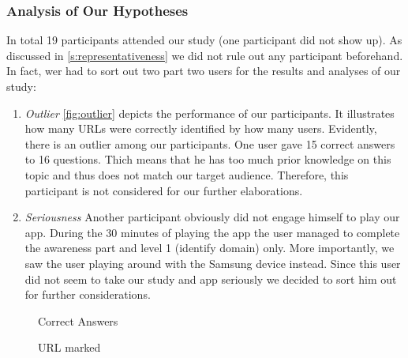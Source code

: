 \subsubsection{Analysis of Our Hypotheses}
\label{s:hypanalysis}
In total 19 participants attended our study (one participant did not show up).
As discussed in \autoref{s:representativeness} we did not rule out any participant beforehand.
In fact, wer had to sort out two part two users for the results and analyses of our study:

\begin{enumerate}
	\item\textit{Outlier} \autoref{fig:outlier} depicts the performance of our participants.
	It illustrates how many URLs were correctly identified by how many users.
	Evidently, there is an outlier among our participants. 
	One user gave 15 correct answers to 16 questions.
	Thich means that he has too much prior knowledge on this topic and thus does not match our target audience.
	Therefore, this participant is not considered for our further elaborations.
	\item\textit{Seriousness} Another participant obviously did not engage himself to play our app.
	During the 30 minutes of playing the app the user managed to complete the awareness part and level 1 (identify domain) only.
	More importantly, we saw the user playing around with the Samsung device instead.
	Since this user did not seem to take our study and app seriously we decided to sort him out for further considerations.
\end{enumerate}

\begin{figure}
\centering
{}
\caption{Correct Answers}
\label{fig:hyp1results}
\end{figure}

\begin{figure}
\centering
{}
\caption{URL marked}
\label{fig:hyp2results}
\end{figure}


